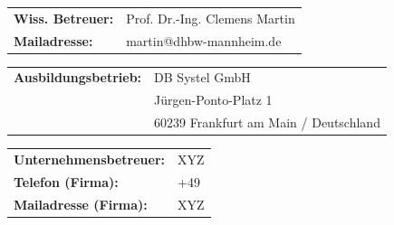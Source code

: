 \begin{titlepage}
\begin{center}
      \begin{tabular}{@{}ll}
      \textbf{Wiss. Betreuer:} & Prof. Dr.-Ing. Clemens Martin \\
      \textbf{Mailadresse:} & martin@dhbw-mannheim.de \\
      \end{tabular}
  
      \vspace{1cm}
  
      \begin{tabular}{@{}ll}
      \textbf{Ausbildungsbetrieb:} & DB Systel GmbH \\
      & Jürgen-Ponto-Platz 1 \\
      & 60239 Frankfurt am Main / Deutschland \\
      \end{tabular}
  
      \vspace{1cm}
  
      \begin{tabular}{@{}ll}
      \textbf{Unternehmensbetreuer:} & XYZ \\
      \textbf{Telefon (Firma):} & +49 \\
      \textbf{Mailadresse (Firma):} & XYZ \\
      \end{tabular}
  
    \end{center}
  
  \end{titlepage}
  